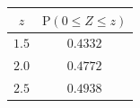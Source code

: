 {\setlength{\tabcolsep}{4pt}\renewcommand{\arraystretch}{1.3}\small%
\begin{tabular}{|c|c|}
\hline
$z$ & $\mathrm{P}(0\le Z\le z)$ \\
\hline
$1.5$ & $0.4332$ \\
\hline
$2.0$ & $0.4772$ \\
\hline
$2.5$ & $0.4938$ \\
\hline
\end{tabular}}
